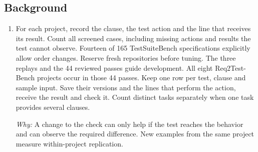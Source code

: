 \documentclass[10pt,a4paper]{article}
\begin{document}
\subsection*{Background}
\begin{enumerate}[leftmargin=*,start=1]
  \item For each project, record the clause, the test action and the line that receives its result. Count all screened cases, including missing actions and results the test cannot observe. Fourteen of 165 TestSuiteBench specifications explicitly allow order changes. Reserve fresh repositories before tuning. The three replays and the 44 reviewed passes guide development. All eight Req2Test-Bench projects occur in those 44 passes. Keep one row per test, clause and sample input. Save their versions and the lines that perform the action, receive the result and check it. Count distinct tasks separately when one task provides several clauses.
\par\emph{Why:} A change to the check can only help if the test reaches the behavior and can observe the required difference. New examples from the same project measure within-project replication.
\end{enumerate}
\end{document}
